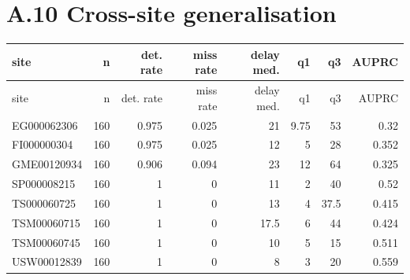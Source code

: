 \documentclass[10pt,a4paper]{article}
\begin{document}
\section*{A.10 Cross-\allowbreak{}site generalisation}
{\small
\setlength{\tabcolsep}{3pt}
\setlength{\LTleft}{\fill}
\setlength{\LTright}{\fill}
\begin{longtable}{lrrrrrrr}
\toprule
site & n & det. rate & miss rate & delay med. & q1 & q3 & AUPRC \\
\midrule
\endfirsthead
\toprule
site & n & det. rate & miss rate & delay med. & q1 & q3 & AUPRC \\
\midrule
\endhead
\bottomrule
\endlastfoot
EG000062306 & 160 & 0.975 & 0.025 & 21 & 9.75 & 53 & 0.32 \\
FI000000304 & 160 & 0.975 & 0.025 & 12 & 5 & 28 & 0.352 \\
GME00120934 & 160 & 0.906 & 0.094 & 23 & 12 & 64 & 0.325 \\
SP000008215 & 160 & 1 & 0 & 11 & 2 & 40 & 0.52 \\
TS000060725 & 160 & 1 & 0 & 13 & 4 & 37.5 & 0.415 \\
TSM00060715 & 160 & 1 & 0 & 17.5 & 6 & 44 & 0.424 \\
TSM00060745 & 160 & 1 & 0 & 10 & 5 & 15 & 0.511 \\
USW00012839 & 160 & 1 & 0 & 8 & 3 & 20 & 0.559 \\
\end{longtable}
}
\end{document}
